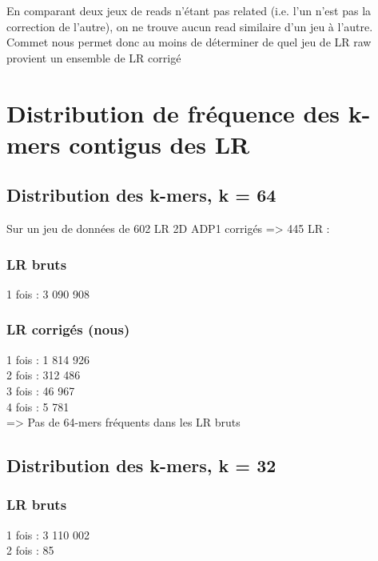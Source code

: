 \documentclass[12pt]{article}
\begin{document}
En comparant deux jeux de reads n'étant pas related (i.e. l'un n'est pas la correction de l'autre), on ne trouve aucun read similaire
d'un jeu à l'autre. Commet nous permet donc au moins de déterminer de quel jeu de LR raw provient un ensemble de LR corrigé

\section{Distribution de fréquence des k-mers contigus des LR}

\subsection{Distribution des k-mers, k = 64}

Sur un jeu de données de 602 LR 2D ADP1 corrigés => 445 LR :

\subsubsection{LR bruts}

1 fois : 3 090 908 \\

\subsubsection{LR corrigés (nous)}

1 fois : 1 814 926 \\

2 fois : 312 486 \\

3 fois : 46 967 \\

4 fois : 5 781 \\

=> Pas de 64-mers fréquents dans les LR bruts

\subsection{Distribution des k-mers, k = 32}

\subsubsection{LR bruts}

1 fois : 3 110 002 \\

2 fois : 85 \\
\end{document}
